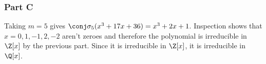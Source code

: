\documentclass[12pt,titlepage]{extarticle}
\begin{document}
\begin{@empty}
\subsubsection*{Part C}
Taking $m = 5$ gives $\homo[5](x^3 + 17x + 36) = x^3 + 2x + 1$. Inspection shows that $x = 0, 1, -1, 2, -2$ aren't zeroes and therefore the polynomial is irreducible in $\Z[x]$ by the previous part. Since it is irreducible in $\Z[x]$, it is irreducible in $\Q[x]$.
    
\end{@empty}
\end{document}
